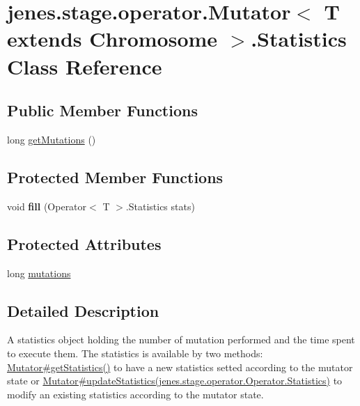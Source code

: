 \hypertarget{classjenes_1_1stage_1_1operator_1_1_mutator_3_01_t_01extends_01_chromosome_01_4_1_1_statistics}{
\section{jenes.stage.operator.Mutator$<$ T extends Chromosome $>$.Statistics Class Reference}
\label{classjenes_1_1stage_1_1operator_1_1_mutator_3_01_t_01extends_01_chromosome_01_4_1_1_statistics}
}
\subsection*{Public Member Functions}
\begin{CompactItemize}
\item 
long \hyperlink{classjenes_1_1stage_1_1operator_1_1_mutator_3_01_t_01extends_01_chromosome_01_4_1_1_statistics_fc74de8d8cf1b0d1cdaf9ec3a170c80e}{getMutations} ()
\end{CompactItemize}
\subsection*{Protected Member Functions}
\begin{CompactItemize}
\item 
\hypertarget{classjenes_1_1stage_1_1operator_1_1_mutator_3_01_t_01extends_01_chromosome_01_4_1_1_statistics_f114cf6ccf66e1bd5d5d7337b4e15e28}{
void \textbf{fill} (Operator$<$ T $>$.Statistics stats)}
\label{classjenes_1_1stage_1_1operator_1_1_mutator_3_01_t_01extends_01_chromosome_01_4_1_1_statistics_f114cf6ccf66e1bd5d5d7337b4e15e28}

\end{CompactItemize}
\subsection*{Protected Attributes}
\begin{CompactItemize}
\item 
long \hyperlink{classjenes_1_1stage_1_1operator_1_1_mutator_3_01_t_01extends_01_chromosome_01_4_1_1_statistics_4328be89d9643f783f5c08164a0aa916}{mutations}
\end{CompactItemize}


\subsection{Detailed Description}
A statistics object holding the number of mutation performed and the time spent to execute them. The statistics is available by two methods: \hyperlink{}{Mutator\#getStatistics()} to have a new statistics setted according to the mutator state or \hyperlink{}{Mutator\#updateStatistics(jenes.stage.operator.Operator.Statistics)} to modify an existing statistics according to the mutator state. 

